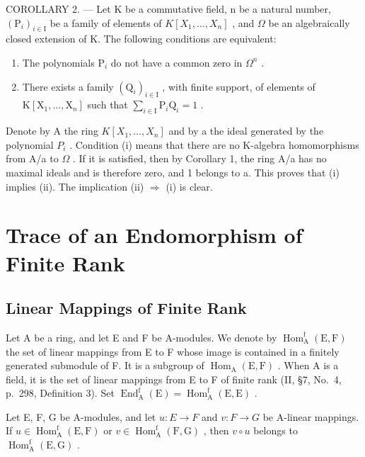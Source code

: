COROLLARY 2. --- Let K be a commutative field, n be a natural number, \((\mathrm{P}_{i})_{i\in\mathrm{I}}\) be a family of elements of \(K[X_{1},\ldots,X_{n}]\) , and \(\Omega\) be an algebraically closed extension of K. The following conditions are equivalent:

\begin{enumerate}
\def\labelenumi{(\roman{enumi})}
\item
  The polynomials \(\mathrm{P}_i\) do not have a common zero in \(\Omega^n\) .
\item
  There exists a family \((\mathrm{Q}_i)_{i\in \mathrm{I}}\) , with finite support, of elements of \(\mathrm{K}[\mathrm{X}_1,\dots ,\mathrm{X}_n]\) such that \(\sum_{i\in \mathrm{I}}\mathrm{P}_i\mathrm{Q}_i = 1\) .
\end{enumerate}

Denote by A the ring \(K[X_{1},\ldots,X_{n}]\) and by a the ideal generated by the polynomial \(P_{i}\) . Condition (i) means that there are no K-algebra homomorphisms from A/a to \(\Omega\) . If it is satisfied, then by Corollary 1, the ring A/a has no maximal ideals and is therefore zero, and 1 belongs to a. This proves that (i) implies (ii). The implication (ii) \(\Rightarrow\) (i) is clear.

\chapter{Trace of an Endomorphism of Finite Rank}

\section{Linear Mappings of Finite Rank}

Let A be a ring, and let E and F be A-modules. We denote by \(\operatorname{Hom}_{\mathrm{A}}^{\mathrm{f}}(\mathrm{E},\mathrm{F})\) the set of linear mappings from E to F whose image is contained in a finitely generated submodule of F. It is a subgroup of \(\operatorname{Hom}_{\mathrm{A}}(\mathrm{E},\mathrm{F})\) . When A is a field, it is the set of linear mappings from E to F of finite rank (II, §7, No.~4, p.~298, Definition 3). Set \(\operatorname{End}_{\mathrm{A}}^{\mathrm{f}}(\mathrm{E}) = \operatorname{Hom}_{\mathrm{A}}^{\mathrm{f}}(\mathrm{E},\mathrm{E})\) .

Let E, F, G be A-modules, and let \(u : E \to F\) and \(v : F \to G\) be A-linear mappings. If \(u \in \operatorname{Hom}_{\mathrm{A}}^{\mathrm{f}}(\mathrm{E}, \mathrm{F})\) or \(v \in \operatorname{Hom}_{\mathrm{A}}^{\mathrm{f}}(\mathrm{F}, \mathrm{G})\) , then \(v \circ u\) belongs to \(\operatorname{Hom}_{\mathrm{A}}^{\mathrm{f}}(\mathrm{E}, \mathrm{G})\) .

